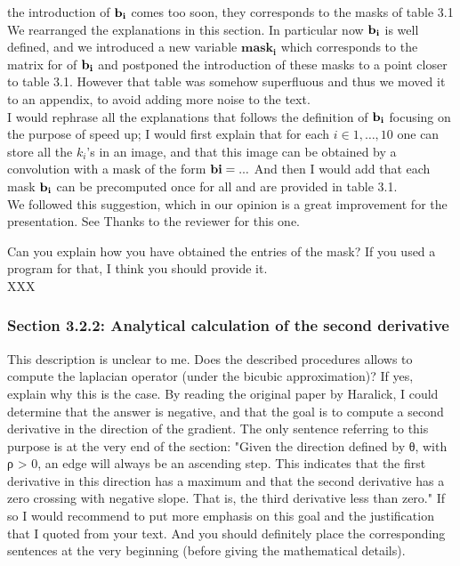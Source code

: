 \documentclass[a4paper,10pt]{report}
\begin{document}
\que the introduction of $\bf{b_i}$ comes too soon, they corresponds to the masks of table 3.1\\

\ans We rearranged the explanations in this section. In particular now $\bf{b_i}$ is well defined, and we introduced a new variable $\mathbf{mask_i}$ which corresponds to the matrix for of $\bf{b_i}$ and postponed the introduction of these masks to a point closer to table 3.1. However that table was somehow superfluous and thus we moved it to an appendix, to avoid adding more noise to the text.\\

\que  I would rephrase all the explanations that follows the definition of $\bf{b_i}$
focusing on the purpose of speed up; I would first explain that for each
$i\in {1,\ldots,10}$ one can store all the $k_i$'s in an image, and that this
image can be obtained by a convolution with a mask of the form $\bf{bi}=...$
And then I would add that each mask $\bf{b_i}$ can be precomputed once for all and are provided in table 3.1.\\

\ans We followed this suggestion, which in our opinion is a great improvement for the presentation. See  Thanks to the reviewer for this one. 

\que Can you explain how you have obtained the entries of the mask? If you used a program for that, I think you should provide it.\\

\ans XXX\\

\subsubsection{Section 3.2.2: Analytical calculation of the second derivative}

\que This description is unclear to me. Does the described procedures allows to
compute the laplacian operator (under the bicubic approximation)? If yes,
explain why this is the case. By reading the original paper by Haralick, I
could determine that the answer is negative, and that the goal is to compute a second derivative in the direction of the gradient. The only sentence referring to this purpose is at the very end of the section:
"Given the direction defined by θ, with ρ > 0, an edge will always be an
ascending step. This indicates that the first derivative in this direction has
a maximum and that the second derivative has a zero crossing with negative
slope. That is, the third derivative less than zero."
If so I would recommend to put more emphasis on this goal and the justification that I quoted from your text. And you should definitely place the
corresponding sentences at the very beginning (before giving the mathematical details).\\
\end{document}
